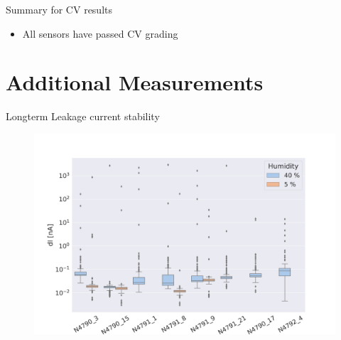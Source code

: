 \documentclass{beamer}
\begin{document}
\begin{frame}{Summary for CV results}
  \begin{table}[htbp] %
      \centering
      \footnotesize%
      \setlength\tabcolsep{2pt}%
      \caption{Summary for all protoA sensors}
      \end{table}   


  \begin{itemize}
      \item \alert{All} sensors have \alert{passed} CV grading      
      
  \end{itemize}
\end{frame}

\section{Additional Measurements}


\begin{frame}{Longterm Leakage current stability}
  \begin{figure}
    \includegraphics[width=.8\textwidth]{plots/RangesForCurrentVariationsDryAir.png}
  \end{figure}
  \href{https://indico.cern.ch/event/1121372/contributions/4708329/attachments/2382634/4071804/Longterm_Leakage_Current_Measurements.pdf}{}
\end{frame}
\end{document}
